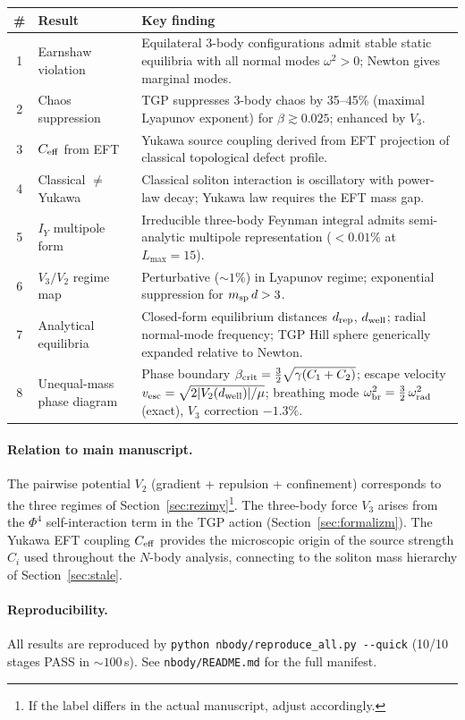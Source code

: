\begin{center}\small
\begin{tabular}{@{}clp{8.5cm}@{}}
\toprule
\textbf{\#} & \textbf{Result} & \textbf{Key finding} \\
\midrule
1 & Earnshaw violation
  & Equilateral 3-body configurations admit stable static equilibria
    with all normal modes $\omega^2 > 0$; Newton gives marginal modes. \\[4pt]
2 & Chaos suppression
  & TGP suppresses 3-body chaos by 35--45\% (maximal Lyapunov exponent)
    for $\beta \gtrsim 0.025$; enhanced by $V_3$. \\[4pt]
3 & $C_{\rm eff}$ from EFT
  & Yukawa source coupling derived from EFT projection of
    classical topological defect profile. \\[4pt]
4 & Classical $\neq$ Yukawa
  & Classical soliton interaction is oscillatory with power-law decay;
    Yukawa law requires the EFT mass gap. \\[4pt]
5 & $I_Y$ multipole form
  & Irreducible three-body Feynman integral admits semi-analytic
    multipole representation ($< 0.01\%$ at $L_{\max} = 15$). \\[4pt]
6 & $V_3/V_2$ regime map
  & Perturbative ($\sim 1\%$) in Lyapunov regime; exponential
    suppression for $m_{\rm sp}\,d > 3$. \\[4pt]
7 & Analytical equilibria
  & Closed-form equilibrium distances $d_{\rm rep}$, $d_{\rm well}$;
    radial normal-mode frequency; TGP Hill sphere generically expanded
    relative to Newton. \\[4pt]
8 & Unequal-mass phase diagram
  & Phase boundary $\beta_{\rm crit} = \frac{3}{2}\sqrt{\gamma(C_1+C_2)}$;
    escape velocity $v_{\rm esc} = \sqrt{2|V_2(d_{\rm well})|/\mu}$;
    breathing mode $\omega_{\rm br}^2 = \frac{3}{2}\,\omega_{\rm rad}^2$
    (exact), $V_3$ correction $-1.3\%$. \\
\bottomrule
\end{tabular}
\end{center}

\paragraph{Relation to main manuscript.}
The pairwise potential $V_2$ (gradient + repulsion + confinement)
corresponds to the three regimes of
Section~\ref{sec:rezimy}\footnote{If the label differs in
the actual manuscript, adjust accordingly.}.
The three-body force $V_3$ arises from the $\Phi^4$
self-interaction term in the TGP action
(Section~\ref{sec:formalizm}\footnotemark[\value{footnote}]).
The Yukawa EFT coupling $C_{\rm eff}$ provides the microscopic
origin of the source strength $C_i$ used throughout the
$N$-body analysis, connecting to the soliton mass hierarchy
of Section~\ref{sec:stale}\footnotemark[\value{footnote}].

\paragraph{Reproducibility.}
All results are reproduced by
\texttt{python nbody/reproduce\_all.py -{}-quick}
(10/10 stages PASS in ${\sim}100$\,s).
See \texttt{nbody/README.md} for the full manifest.

